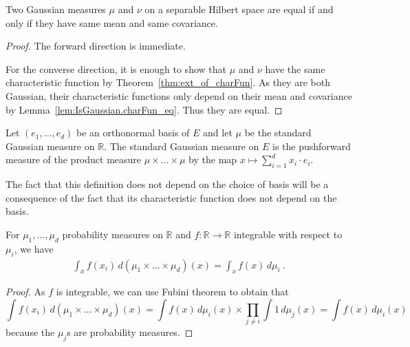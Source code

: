 \begin{lemma}\label{lem:IsGaussian.ext_iff}
  \leanok
Two Gaussian measures $\mu$ and $\nu$ on a separable Hilbert space are equal if and only if they have same mean and same covariance.
\end{lemma}

\begin{proof}\leanok
The forward direction is immediate.

For the converse direction, it is enough to show that $\mu$ and $\nu$ have the same characteristic function by Theorem~\ref{thm:ext_of_charFun}. As they are both Gaussian, their characteristic functions only depend on their mean and covariance by Lemma~\ref{lem:IsGaussian.charFun_eq}. Thus they are equal.
\end{proof}


\begin{definition}\label{def:stdGaussian}
  \leanok
Let $(e_1, \ldots, e_d)$ be an orthonormal basis of $E$ and let $\mu$ be the standard Gaussian measure on $\mathbb{R}$.
The standard Gaussian measure on $E$ is the pushforward measure of the product measure $\mu \times \ldots \times \mu$ by the map $x \mapsto \sum_{i=1}^d x_i \cdot e_i$.
\end{definition}

The fact that this definition does not depend on the choice of basis will be a consequence of the fact that its characteristic function does not depend on the basis.


\begin{lemma}\label{lem:integral_eval_pi}
  \mathlibok
For $\mu_1, \ldots, \mu_d$ probability measures on $\mathbb{R}$ and $f : \mathbb{R} \to \mathbb{R}$ integrable with respect to $\mu_i$, we have
\begin{align*}
  \int_x f(x_i) \, d(\mu_1 \times \ldots \times \mu_d)(x)
  = \int_x f(x) \, d\mu_i
  \: .
\end{align*}
\end{lemma}

\begin{proof}\leanok
As $f$ is integrable, we can use Fubini theorem to obtain that
$$\int f(x_i) \, d(\mu_1 \times \ldots \times \mu_d)(x) = \int f(x) \, d\mu_i(x) \times \prod_{j \ne i} \int 1 \, d\mu_j(x) = \int f(x) \, d\mu_i(x)$$
because the $\mu_j$s are probability measures.
\end{proof}


